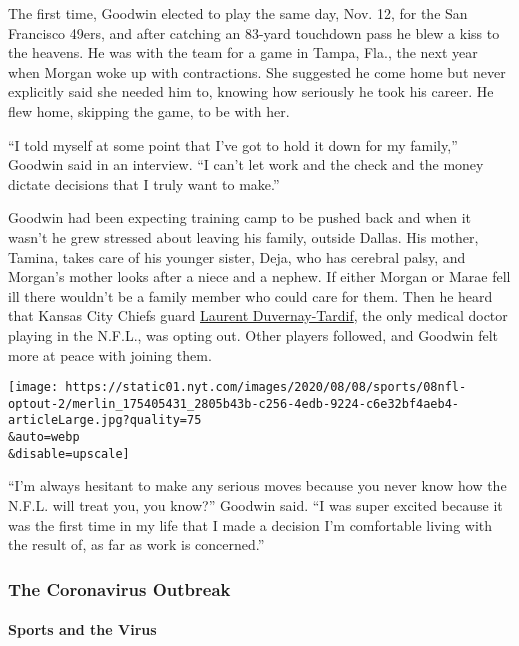 The first time, Goodwin elected to play the same day, Nov. 12, for the
San Francisco 49ers, and after catching an 83-yard touchdown pass he
blew a kiss to the heavens. He was with the team for a game in Tampa,
Fla., the next year when Morgan woke up with contractions. She suggested
he come home but never explicitly said she needed him to, knowing how
seriously he took his career. He flew home, skipping the game, to be
with her.

``I told myself at some point that I've got to hold it down for my
family,'' Goodwin said in an interview. ``I can't let work and the check
and the money dictate decisions that I truly want to make.''

Goodwin had been expecting training camp to be pushed back and when it
wasn't he grew stressed about leaving his family, outside Dallas. His
mother, Tamina, takes care of his younger sister, Deja, who has cerebral
palsy, and Morgan's mother looks after a niece and a nephew. If either
Morgan or Marae fell ill there wouldn't be a family member who could
care for them. Then he heard that Kansas City Chiefs guard
\href{https://www.nytimes.com/2018/05/30/sports/laurent-duvernay-tardif-nfl-doctor-chiefs.html}{Laurent
Duvernay-Tardif}, the only medical doctor playing in the N.F.L., was
opting out. Other players followed, and Goodwin felt more at peace with
joining them.

\texttt{[image: https://static01.nyt.com/images/2020/08/08/sports/08nfl-optout-2/merlin\_175405431\_2805b43b-c256-4edb-9224-c6e32bf4aeb4-articleLarge.jpg?quality=75\\\&auto=webp\\\&disable=upscale]}

``I'm always hesitant to make any serious moves because you never know
how the N.F.L. will treat you, you know?'' Goodwin said. ``I was super
excited because it was the first time in my life that I made a decision
I'm comfortable living with the result of, as far as work is
concerned.''

\hypertarget{the-coronavirus-outbreak}{%
\subsubsection{The Coronavirus
Outbreak}\label{the-coronavirus-outbreak}}

\hypertarget{sports-and-the-virus}{%
\paragraph{Sports and the Virus}\label{sports-and-the-virus}}

